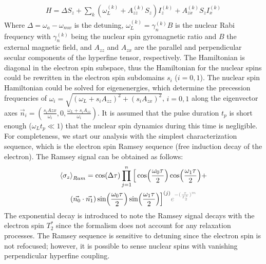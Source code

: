 \documentclass[%
 reprint,
superscriptaddress,
 amsmath,amssymb,
 aps,
]{revtex4-2}
\begin{document}
\begin{align}
	H = \Delta S_z + \sum_k (\omega_L^{(k)}  + A_{zz}^{(k)} S_z) I_z^{(k)} + A_{zx}^{(k)} S_z I_x^{(k)}
	\label{eq:H}
\end{align}
Where $\Delta = \omega_a - \omega_{mw}$ is the detuning, $\omega_L^{(k)} =\gamma_n^{(k)} B$ is the nuclear Rabi frequency with $\gamma_n^{(k)}$ being the nuclear spin gyromagnetic ratio and $B$ the external magnetic field, and $A_{zz}$ and $A_{zx}$ are the parallel and perpendicular secular components of the hyperfine tensor, respectively.
The Hamiltonian is diagonal in the electron spin subspace, thus the Hamiltonian for the nuclear spins could be rewritten in the electron spin subdomains $s_i$ ($i=0,1$).
The nuclear spin Hamiltonian could be solved for eigenenergies, which determine the precession frequencies of $\omega_i = \sqrt{(\omega_L + s_i A_{zz})^2+ (s_i A_{zx})^2}$, $i=0,1$ along the eigenvector axes $\vec{n}_i =(\frac{s_i A{zx}}{\omega_i}, 0, \frac{\omega_L + s_i A_{zz}} {\omega_i})$.
It is assumed that the pulse duration $t_p$ is short enough ($\omega_L t_p \ll 1$) that the nuclear spin dynamics during this time is negligible.
For completeness, we start our analysis with the simplest characterization sequence, which is the electron spin Ramsey sequence (free induction decay of the electron).
The Ramsey signal can be obtained as follows:
\begin{gather}
	\expval{\sigma_z}_{Ram} = \cos(\Delta \tau) \prod_{j=1}^{n} \Big[ \cos(\frac{\omega_0 \tau}{2}) \cos(\frac{\omega_1 \tau}{2})+ \notag \\
	(\vec{n_0}\cdot \vec{n_1})\sin(\frac{\omega_0 \tau}{2}) \sin(\frac{\omega_1 \tau}{2}) \Big]^{(j)}
	\textcolor{gray}{e^{-(\frac{\tau}{T_2^\ast})^m}}
\end{gather}	
The exponential decay is introduced to note the Ramsey signal decays with the electron spin $T_2^\ast$ since the formalism does not account for any relaxation processes. The Ramsey sequence is sensitive to detuning since the electron spin is not refocused; however, it is possible to sense nuclear spins with vanishing perpendicular hyperfine coupling.\\
\end{document}
